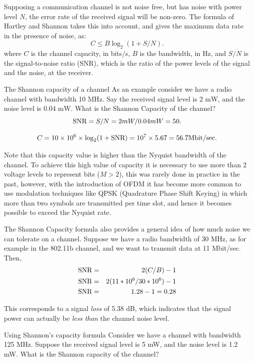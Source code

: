 Supposing a communication channel is not noise free, but has noise with power level $N$, the
error rate of the received signal will be non-zero. The formula of Hartley and
Shannon takes this into account, and gives the maximum data rate in the presence of noise,
as:
$$
C \leq B \log_{2} (1 + S/N). 
$$
where $C$ is the channel capacity, in bits/s, $B$ is the bandwidth, in Hz, and $S/N$ is the 
signal-to-noise ratio (SNR),
which is the ratio of the power levels of the signal and the noise, 
at the receiver. 

\begin{sbexample}{The Shannon capacity of a channel}%
As an example consider we have a radio channel with bandwidth 10
\textsc{MH}z. Say the received signal level is 2 m\textsc{W}, and the
noise level is 0.04 m\textsc{W}. What is the Shannon Capacity of the
channel?  
$$ 
\hbox{SNR} = S/N = 2mW / 0.04 mW = 50 .  
$$

$$
C = 10\times 10^{6} \times \log_{2}(1 + \hbox{SNR}) = 10^{7} \times 5.67 = 56.7 \hbox{Mbit/sec} .
$$
\end{sbexample}


Note that this capacity value is higher than the Nyquist bandwidth of
the channel. To achieve this high value of capacity it is necessary to
use more than 2 voltage levels to represent bits ($M > 2$), this was
rarely done in practice in the past, however, with the introduction of
OFDM it has become more common to use modulation techniques like QPSK
(Quadrature Phase Shift Keying) in which more than two symbols are transmitted per time slot,
and hence it becomes possible to exceed the Nyquist rate.

The Shannon Capacity formula also provides a general idea of how much noise we can 
tolerate on a channel. Suppose we have a radio bandwidth of 30 MHz, as for example in the
802.11b channel, and we want to transmit data at 11 Mbit/sec. Then,
\begin{eqnarray}\nonumber
\hbox{SNR} &=& 2(C/B)-1 \\
\nonumber
\hbox{SNR} &=& 2(11*10^{6}/30*10^{6})-1 \\
\nonumber
\hbox{SNR} &=& 1.28-1=0.28
\end{eqnarray}

This corresponds to a signal \textit{loss} of 5.38 dB, which indicates
that the signal power can actually be \textit{less than} the channel
noise level.

\begin{exercise}{Using Shannon's capacity formula}
Consider we have a channel with bandwidth 125 MHz. Suppose the received
signal level is 5 mW, and the noise level is 1.2 mW. What is the Shannon capacity of
the channel?
\end{exercise}


